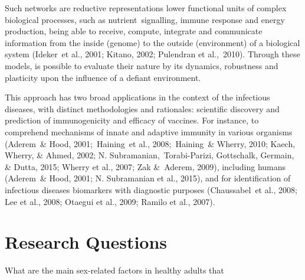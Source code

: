 \documentclass[
]{book}
\begin{document}
Such networks are reductive representations lower functional units of complex biological processes, such as nutrient~signalling, immune response and energy production, being able to receive, compute, integrate and communicate information from the inside (genome) to the outside (environment) of a biological system (Ideker~et al., 2001; Kitano, 2002; Pulendran et al.,~2010)⁠. Through these models, is possible to evaluate their nature by its dynamics, robustness and plasticity upon the influence of a defiant environment.

This approach has two broad applications in the context of the infectious diseases, with distinct methodologies and rationales: scientific discovery and prediction of immunogenicity and efficacy of vaccines. For instance, to comprehend mechanisms of innate and adaptive immunity in various organisms (Aderem~\& Hood, 2001;~Haining~et al., 2008;~Haining~\& Wherry, 2010; Kaech, Wherry, \& Ahmed, 2002; N. Subramanian,~Torabi-Parizi, Gottschalk, Germain, \& Dutta, 2015; Wherry et al., 2007; Zak \&~Aderem, 2009), including humans (Aderem~\& Hood, 2001; N. Subramanian et al., 2015)⁠, and for identification of infectious diseases biomarkers with diagnostic purposes (Chaussabel~et al., 2008; Lee et al., 2008; Otaegui et al., 2009; Ramilo et al., 2007).

\hypertarget{research-questions}{%
\chapter{Research Questions}\label{research-questions}}

What are the main sex-related factors in healthy adults that
\end{document}
